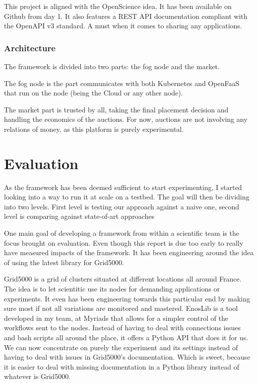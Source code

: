 \documentclass[11pt]{sdm}
\begin{document}
This project is aligned with the OpenScience idea. It has been available on Github from day 1. It also features a REST API documentation compliant with the OpenAPI v3 standard. A must when it comes to sharing any applications.

\subsubsection{Architecture}

The framework is divided into two parts: the fog node and the market. 

The fog node is the part communicates with both Kubernetes and OpenFaaS that run on the node (being the Cloud or any other node).

The market part is trusted by all, taking the final placement decision and handling the economics of the auctions. For now, auctions are not involving any relations of money, as this platform is purely experimental.


\section{Evaluation}

As the framework has been deemed sufficient to start experimenting, I started looking into a way to run it at scale on a testbed. The goal will then be dividing into two levels. First level is testing our approach against a naive one, second level is comparing against state-of-art approaches \cite{bermbach_auctionwhisk_2021, tasiopoulos_fogspot_2019}

One main goal of developing a framework from within a scientific team is the focus brought on evaluation. Even though this report is due too early to really have measured impacts of the framework. It has been engineering around the idea of using the latest library for Grid5000.

Grid5000 is a grid of clusters situated at different locations all around France. The idea is to let scientitic use its nodes for demanding applications or experiments. It even has been engineering towards this particular end by making sure most if not all variations are monitored and mastered. EnosLib is a tool developed in my team, at Myriads that allows for a simpler control of the workflows sent to the nodes. Instead of having to deal with connections issues and bash scripts all around the place, it offers a Python API that does it for us. We can now concentrate on purely the experiment and its settings instead of having to deal with issues in Grid5000's documentation. Which is sweet, because it is easier to deal with missing documentation in a Python library instead of whatever is Grid5000.
\end{document}
